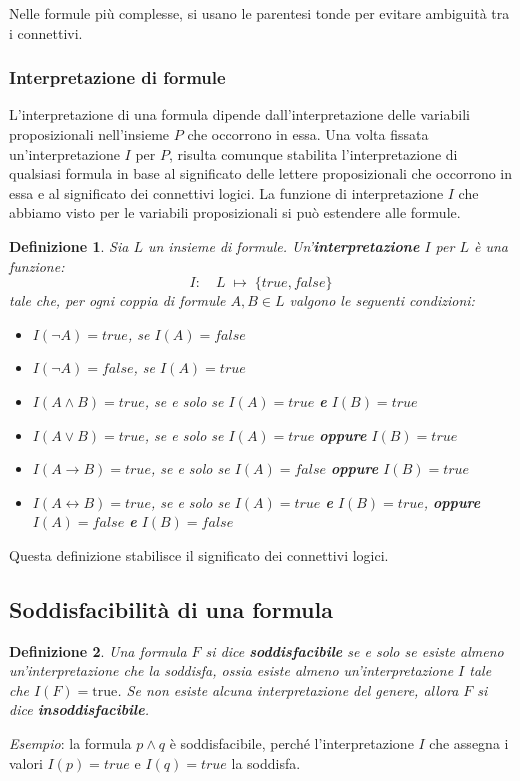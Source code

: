 \documentclass[a4paper,12pt]{report}
\newcommand{\tto} {\leftrightarrow}
\newtheorem{definition}{Definizione}[section]
\begin{document}
Nelle formule più complesse, si usano le parentesi tonde per evitare ambiguità tra i connettivi.

\subsubsection*{Interpretazione di formule}
L'interpretazione di una formula dipende dall'interpretazione delle variabili proposizionali nell'insieme $P$ che occorrono in essa. Una volta fissata un'interpretazione $I$ per $P$, risulta comunque stabilita l'interpretazione di qualsiasi formula in base al significato delle lettere proposizionali che occorrono in essa e al significato dei connettivi logici. La funzione di interpretazione $I$ che abbiamo visto per le variabili proposizionali si può estendere alle formule.

\begin{definition}
    Sia $L$ un insieme di formule. Un'\textbf{interpretazione} $I$ per $L$ è una funzione:
    \[
        I: \quad L \; \mapsto \; \{true, false\}
    \]
    tale che, per ogni coppia di formule $A, B \in L$ valgono le seguenti condizioni:
    \begin{itemize}
        \item $I(\lnot A) = true$, se $I(A) = false$
        \item $I(\lnot A) = false$, se $I(A) = true$
        \item $I(A \land B) = true$, se e solo se $I(A) = true$ \textbf{e} $I(B) = true$
        \item $I(A \lor B) = true$, se e solo se $I(A) = true$ \textbf{oppure} $I(B) = true$
        \item $I(A \to B) = true$, se e solo se $I(A) = false$ \textbf{oppure} $I(B) = true$
        \item $I(A \tto B) = true$, se e solo se $I(A) = true$ \textbf{e} $I(B) = true$, \textbf{oppure} $I(A) = false$ \textbf{e} $I(B) = false$
    \end{itemize}
\end{definition}
\noindent Questa definizione stabilisce il significato dei connettivi logici.

\subsection{Soddisfacibilità di una formula}
\begin{definition}
    Una formula $F$ si dice \textbf{soddisfacibile} se e solo se esiste almeno un'interpretazione che la soddisfa, ossia esiste almeno un'interpretazione $I$ tale che $I(F) = \text{true}$. Se non esiste alcuna interpretazione del genere, allora $F$ si dice \textbf{insoddisfacibile}.
\end{definition}
\noindent \emph{Esempio}: la formula $p \land q$ è soddisfacibile, perché l'interpretazione $I$ che assegna i valori $I(p) = true$ e $I(q) = true$ la soddisfa.
\end{document}
